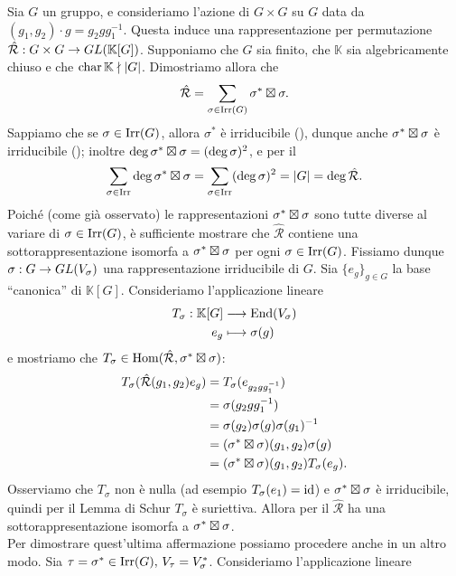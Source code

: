 \begin{example}
Sia $G$ un gruppo, e consideriamo l'azione di $G\times G$ su $G$ data da $(g_1,g_2)\cdot g=g_2gg_1^{-1}$. Questa induce una rappresentazione per permutazione $\hat{\mathcal{R}}:G\times G\to GL(\mathbb{K}[G])$. Supponiamo che $G$ sia finito, che $\mathbb{K}$ sia algebricamente chiuso e che $\operatorname{char}\mathbb{K}\nmid|G|$. Dimostriamo allora che
$$
\hat{\mathcal{R}}=\sum_{\sigma\in\operatorname{Irr}(G)}\sigma^*\boxtimes\sigma.
$$
Sappiamo che se $\sigma\in\operatorname{Irr}(G)$, allora $\sigma^*$ è irriducibile (), dunque anche $\sigma^*\boxtimes\sigma$ è irriducibile (); inoltre $\deg\sigma^*\boxtimes\sigma=(\deg\sigma)^2$, e per il 
$$
\sum_{\sigma\in\operatorname{Irr}}\deg\sigma^*\boxtimes\sigma=\sum_{\sigma\in\operatorname{Irr}}(\deg\sigma)^2=|G|=\deg\hat{\mathcal{R}}.
$$
Poiché (come già osservato) le rappresentazioni $\sigma^*\boxtimes\sigma$ sono tutte diverse al variare di $\sigma\in\operatorname{Irr}(G)$, è sufficiente mostrare che $\hat{\mathcal{R}}$ contiene una sottorappresentazione isomorfa a $\sigma^*\boxtimes\sigma$ per ogni $\sigma\in\operatorname{Irr}(G)$. Fissiamo dunque $\sigma:G\to GL(V_\sigma)$ una rappresentazione irriducibile di $G$. Sia $\{e_g\}_{g\in G}$ la base ``canonica'' di $\mathbb{K}[G]$. Consideriamo l'applicazione lineare
\begin{align*}
T_\sigma:\mathbb{K}[G]&\longrightarrow\operatorname{End}(V_\sigma)\\
e_g&\longmapsto\sigma(g)
\end{align*}
e mostriamo che $T_\sigma\in\operatorname{Hom}(\hat{\mathcal{R}},\sigma^*\boxtimes\sigma)$:
\begin{align*}
T_\sigma(\hat{\mathcal{R}}(g_1,g_2)e_g)&=T_\sigma(e_{g_2gg_1^{-1}})\\
&=\sigma(g_2gg_1^{-1})\\
&=\sigma(g_2)\sigma(g)\sigma(g_1)^{-1}\\
&=(\sigma^*\boxtimes\sigma)(g_1,g_2)\sigma(g)\\
&=(\sigma^*\boxtimes\sigma)(g_1,g_2)T_\sigma(e_g).
\end{align*}
Osserviamo che $T_\sigma$ non è nulla (ad esempio $T_\sigma(e_1)=\operatorname{id}$) e $\sigma^*\boxtimes\sigma$ è irriducibile, quindi per il Lemma di Schur $T_\sigma$ è suriettiva. Allora per il  $\hat{\mathcal{R}}$ ha una sottorappresentazione isomorfa a $\sigma^*\boxtimes\sigma$.\\
Per dimostrare quest'ultima affermazione possiamo procedere anche in un altro modo. Sia $\tau=\sigma^*\in\operatorname{Irr}(G),\,\allowbreak V_\tau=V_\sigma^*$. Consideriamo l'applicazione lineare

\end{example}
